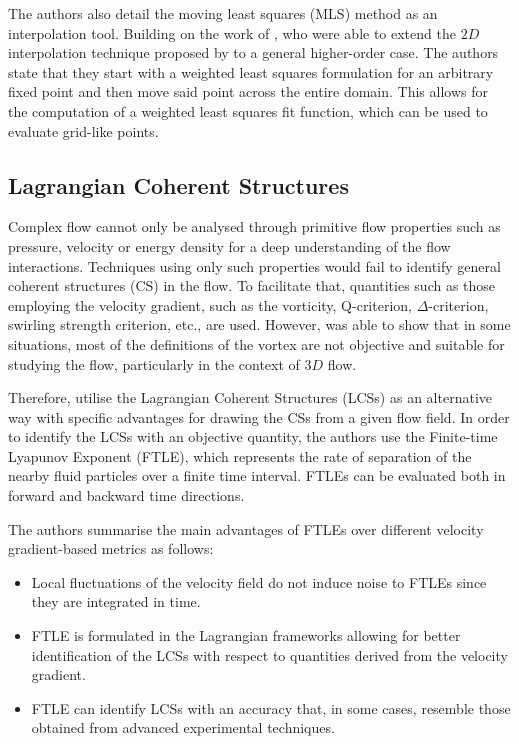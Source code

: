 The authors also detail the moving least squares (MLS) method as an interpolation tool. Building on the work of \cite{lancaster1981surfaces}, who were able to extend the $2D$ interpolation technique proposed by \cite{shepard1968two} to a general higher-order case. The authors state that they start with a weighted least squares formulation for an arbitrary fixed point and then move said point across the entire domain. This allows for the computation of a weighted least squares fit function, which can be used to evaluate grid-like points.

\subsection{Lagrangian Coherent Structures}
Complex flow cannot only be analysed through primitive flow properties such as pressure, velocity or energy density for a deep understanding of the flow interactions. Techniques using only such properties would fail to identify general coherent structures (CS) in the flow. To facilitate that, quantities such as those employing the velocity gradient, such as the vorticity, Q-criterion, $\Delta$-criterion, swirling strength criterion, etc., are used. 
However, \cite{haller2005objective} was able to show that in some situations, most of the definitions of the vortex are not objective and suitable for studying the flow, particularly in the context of $3D$ flow.

Therefore, \cite{sun2016detection} utilise the Lagrangian Coherent Structures (LCSs) as an alternative way with specific advantages for drawing the CSs from a given flow field. In order to identify the LCSs with an objective quantity, the authors use the Finite-time Lyapunov Exponent (FTLE), which represents the rate of separation of the nearby fluid particles over a finite time interval. FTLEs can be evaluated both in forward and backward time directions.

The authors summarise the main advantages of FTLEs over different velocity gradient-based metrics as follows:
\begin{itemize}
    \item Local fluctuations of the velocity field do not induce noise to FTLEs since they are integrated in time.
    
    \item FTLE is formulated in the Lagrangian frameworks allowing for better identification of the LCSs with respect to quantities derived from the velocity gradient.
    
    \item FTLE can identify LCSs with an accuracy that, in some cases, resemble those obtained from advanced experimental techniques.
\end{itemize}

